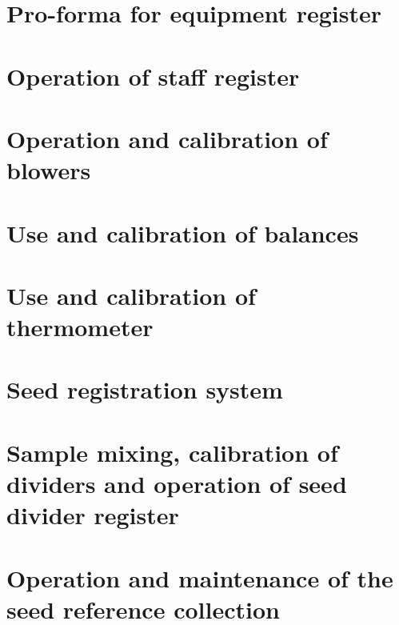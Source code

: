 \documentclass[
]{book}
\begin{document}
\hypertarget{pro-forma-for-equipment-register}{%
\chapter{Pro-forma for equipment register}\label{pro-forma-for-equipment-register}}

\hypertarget{operation-of-staff-register}{%
\chapter{Operation of staff register}\label{operation-of-staff-register}}

\hypertarget{operation-and-calibration-of-blowers}{%
\chapter{Operation and calibration of blowers}\label{operation-and-calibration-of-blowers}}

\hypertarget{use-and-calibration-of-balances}{%
\chapter{Use and calibration of balances}\label{use-and-calibration-of-balances}}

\hypertarget{use-and-calibration-of-thermometer}{%
\chapter{Use and calibration of thermometer}\label{use-and-calibration-of-thermometer}}

\hypertarget{seed-registration-system}{%
\chapter{Seed registration system}\label{seed-registration-system}}

\hypertarget{sample-mixing-calibration-of-dividers-and-operation-of-seed-divider-register}{%
\chapter{Sample mixing, calibration of dividers and operation of seed divider register}\label{sample-mixing-calibration-of-dividers-and-operation-of-seed-divider-register}}

\hypertarget{operation-and-maintenance-of-the-seed-reference-collection}{%
\chapter{Operation and maintenance of the seed reference collection}\label{operation-and-maintenance-of-the-seed-reference-collection}}
\end{document}
